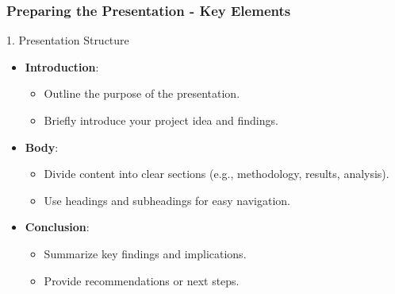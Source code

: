 \documentclass{beamer}
\begin{document}
\begin{frame}[fragile]
    \frametitle{Preparing the Presentation - Key Elements}
    \begin{block}{1. Presentation Structure}
        \begin{itemize}
            \item \textbf{Introduction}:
                \begin{itemize}
                    \item Outline the purpose of the presentation.
                    \item Briefly introduce your project idea and findings.
                \end{itemize}
            \item \textbf{Body}:
                \begin{itemize}
                    \item Divide content into clear sections (e.g., methodology, results, analysis).
                    \item Use headings and subheadings for easy navigation.
                \end{itemize}
            \item \textbf{Conclusion}:
                \begin{itemize}
                    \item Summarize key findings and implications.
                    \item Provide recommendations or next steps.
                \end{itemize}
        \end{itemize}
    \end{block}
\end{frame}
\end{document}
